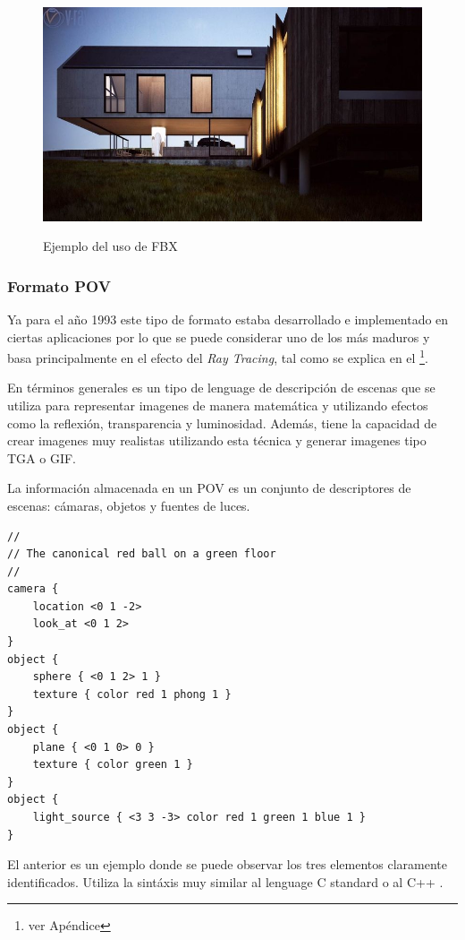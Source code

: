 \documentclass[11pt,letterpaper]{article}     %
\begin{document}
\begin{figure}[hbtp]
\caption{Ejemplo del uso de FBX}
\centering
\includegraphics[scale=0.5]{imagenes/fbx1.jpg}
\label{fig:fbx1}
\end{figure}


\subsubsection{Formato POV}
Ya para el a\~ no 1993 este tipo de formato estaba desarrollado e implementado en ciertas aplicaciones por lo que se puede considerar uno de los m\' as maduros y basa principalmente en el efecto del \textit{Ray Tracing}, tal como se explica en el \footnote{ver Ap\' endice }.

En t\' erminos generales es un tipo de lenguage de descripci\' on de escenas que se utiliza para representar imagenes de manera matem\' atica y utilizando efectos como la reflexi\' on, transparencia y luminosidad. Adem\' as, tiene la capacidad de crear imagenes muy realistas utilizando esta t\' ecnica y generar imagenes tipo TGA o GIF.

La informaci\' on almacenada en un POV es un conjunto de descriptores de escenas: c\' amaras, objetos y fuentes de luces. 

\begin{lstlisting}
//
// The canonical red ball on a green floor
//
camera {
	location <0 1 -2>
	look_at <0 1 2>
}
object {
	sphere { <0 1 2> 1 }
	texture { color red 1 phong 1 }
}
object {
	plane { <0 1 0> 0 }
	texture { color green 1 }
}
object {
	light_source { <3 3 -3> color red 1 green 1 blue 1 }
}
\end{lstlisting}

El anterior es un ejemplo donde se puede observar los tres elementos claramente identificados. 
Utiliza la sint\' axis muy similar al lenguage C standard o al C++ \cite{povformat}.
\end{document}
